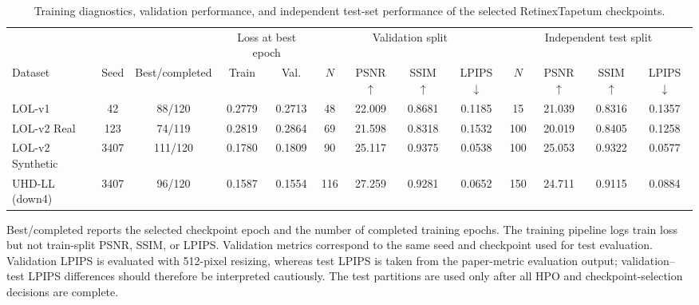 \begin{table}[t]
  \centering
  \caption{Training diagnostics, validation performance, and independent
  test-set performance of the selected RetinexTapetum checkpoints.}
  \label{tab:retinextapetum-train-test}
  \scriptsize
  \setlength{\tabcolsep}{3.2pt}
  \begin{threeparttable}
    \begin{adjustbox}{max width=\textwidth}
      \begin{tabular}{lcccccccccccc}
        \toprule
        & & &
        \multicolumn{2}{c}{Loss at best epoch} &
        \multicolumn{4}{c}{Validation split} &
        \multicolumn{4}{c}{Independent test split} \\
        \cmidrule(lr){4-5}
        \cmidrule(lr){6-9}
        \cmidrule(lr){10-13}
        Dataset
          & Seed
          & Best/completed
          & Train
          & Val.
          & $N$
          & PSNR $\uparrow$
          & SSIM $\uparrow$
          & LPIPS $\downarrow$
          & $N$
          & PSNR $\uparrow$
          & SSIM $\uparrow$
          & LPIPS $\downarrow$ \\
        \midrule
        LOL-v1
          & 42 & 88/120
          & 0.2779 & 0.2713
          & 48 & 22.009 & 0.8681 & 0.1185
          & 15 & 21.039 & 0.8316 & 0.1357 \\
        LOL-v2 Real
          & 123 & 74/119
          & 0.2819 & 0.2864
          & 69 & 21.598 & 0.8318 & 0.1532
          & 100 & 20.019 & 0.8405 & 0.1258 \\
        LOL-v2 Synthetic
          & 3407 & 111/120
          & 0.1780 & 0.1809
          & 90 & 25.117 & 0.9375 & 0.0538
          & 100 & 25.053 & 0.9322 & 0.0577 \\
        UHD-LL (down4)
          & 3407 & 96/120
          & 0.1587 & 0.1554
          & 116 & 27.259 & 0.9281 & 0.0652
          & 150 & 24.711 & 0.9115 & 0.0884 \\
        \bottomrule
      \end{tabular}
    \end{adjustbox}
    \begin{tablenotes}[flushleft]
      \footnotesize
      \item Best/completed reports the selected checkpoint epoch and the number
      of completed training epochs. The training pipeline logs train loss but
      not train-split PSNR, SSIM, or LPIPS. Validation metrics correspond to
      the same seed and checkpoint used for test evaluation. Validation LPIPS
      is evaluated with 512-pixel resizing, whereas test LPIPS is taken from
      the paper-metric evaluation output; validation--test LPIPS differences
      should therefore be interpreted cautiously. The test partitions are used
      only after all HPO and checkpoint-selection decisions are complete.
    \end{tablenotes}
  \end{threeparttable}
\end{table}
